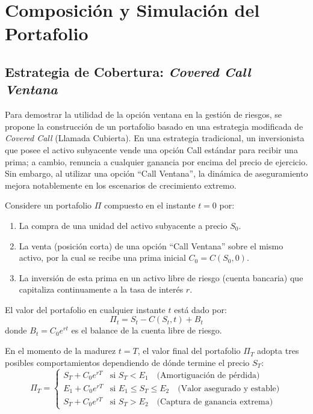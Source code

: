 \documentclass[12pt]{article}
\begin{document}
\section{Composición y Simulación del Portafolio}

\subsection{Estrategia de Cobertura: \textit{Covered Call Ventana}}

Para demostrar la utilidad de la opción ventana en la gestión de riesgos, se propone la construcción de un portafolio basado en una estrategia modificada de \textit{Covered Call} (Llamada Cubierta). En una estrategia tradicional, un inversionista que posee el activo subyacente vende una opción Call estándar para recibir una prima; a cambio, renuncia a cualquier ganancia por encima del precio de ejercicio. Sin embargo, al utilizar una opción ``Call Ventana'', la dinámica de aseguramiento mejora notablemente en los escenarios de crecimiento extremo.

Considere un portafolio $\Pi$ compuesto en el instante $t=0$ por:
\begin{enumerate}
    \item La compra de una unidad del activo subyacente a precio $S_0$.
    \item La venta (posición corta) de una opción ``Call Ventana'' sobre el mismo activo, por la cual se recibe una prima inicial $C_0 = C(S_0, 0)$.
    \item La inversión de esta prima en un activo libre de riesgo (cuenta bancaria) que capitaliza continuamente a la tasa de interés $r$.
\end{enumerate}

El valor del portafolio en cualquier instante $t$ está dado por:
\begin{equation}
\Pi_t = S_t - C(S_t, t) + B_t
\end{equation}
donde $B_t = C_0 e^{rt}$ es el balance de la cuenta libre de riesgo. 

En el momento de la madurez $t=T$, el valor final del portafolio $\Pi_T$ adopta tres posibles comportamientos dependiendo de dónde termine el precio $S_T$:
\begin{equation}
\Pi_T = 
\begin{cases} 
S_T + C_0 e^{rT} & \text{si } S_T < E_1 \quad \text{(Amortiguación de pérdida)} \\
E_1 + C_0 e^{rT} & \text{si } E_1 \leq S_T \leq E_2 \quad \text{(Valor asegurado y estable)} \\
S_T + C_0 e^{rT} & \text{si } S_T > E_2 \quad \text{(Captura de ganancia extrema)}
\end{cases}
\end{equation}
\end{document}
